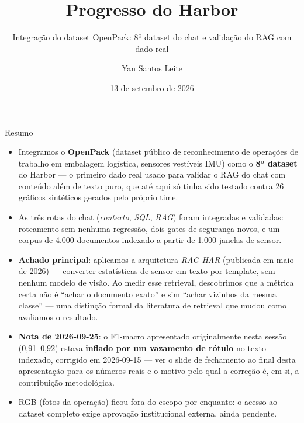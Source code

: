 \documentclass{beamer}
\title{Progresso do Harbor}
\subtitle{Integração do dataset OpenPack: 8º dataset do chat e validação do RAG com dado real}
\author{Yan Santos Leite}
\date{13 de setembro de 2026}
\begin{document}
\frame{\titlepage}

\begin{frame}{Resumo}
  \begin{itemize}
    \item Integramos o \textbf{OpenPack} (dataset público de reconhecimento de operações de
      trabalho em embalagem logística, sensores vestíveis IMU) como o \textbf{8º dataset} do
      Harbor — o primeiro dado real usado para validar o RAG do chat com conteúdo além de
      texto puro, que até aqui só tinha sido testado contra 26 gráficos sintéticos gerados
      pelo próprio time.
    \item As três rotas do chat (\emph{contexto}, \emph{SQL}, \emph{RAG}) foram integradas e
      validadas: roteamento sem nenhuma regressão, dois gates de segurança novos, e um corpus
      de 4.000 documentos indexado a partir de 1.000 janelas de sensor.
    \item \textbf{Achado principal}: aplicamos a arquitetura \emph{RAG-HAR} (publicada em maio
      de 2026) — converter estatísticas de sensor em texto por template, sem nenhum modelo de
      visão. Ao medir esse retrieval, descobrimos que a métrica certa não é ``achar o documento
      exato'' e sim ``achar vizinhos da mesma classe'' — uma distinção formal da literatura de
      retrieval que mudou como avaliamos o resultado.
    \item \textbf{Nota de 2026-09-25}: o F1-macro apresentado originalmente nesta sessão
      (0,91--0,92) estava \textbf{inflado por um vazamento de rótulo} no texto indexado,
      corrigido em 2026-09-15 — ver o slide de fechamento ao final desta apresentação para os
      números reais e o motivo pelo qual a correção é, em si, a contribuição metodológica.
    \item RGB (fotos da operação) ficou fora do escopo por enquanto: o acesso ao dataset
      completo exige aprovação institucional externa, ainda pendente.
  \end{itemize}
\end{frame}
\end{document}
